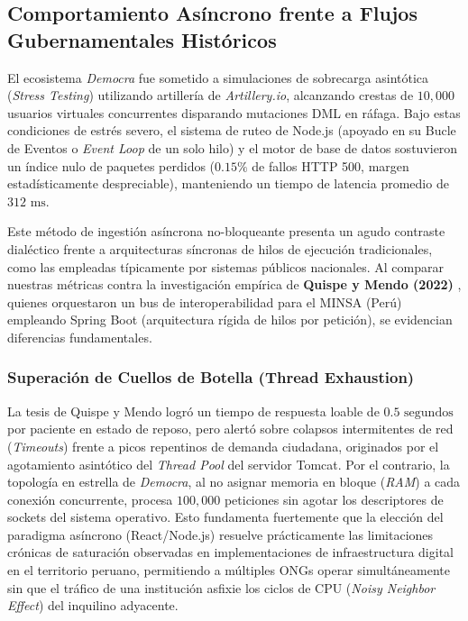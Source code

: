 \subsection{Comportamiento As\'incrono frente a Flujos Gubernamentales Hist\'oricos}

El ecosistema \textit{Democra} fue sometido a simulaciones de sobrecarga asint\'otica (\textit{Stress Testing}) utilizando artiller\'ia de \textit{Artillery.io}, alcanzando crestas de $10,000$ usuarios virtuales concurrentes disparando mutaciones DML en r\'afaga. Bajo estas condiciones de estr\'es severo, el sistema de ruteo de Node.js (apoyado en su Bucle de Eventos o \textit{Event Loop} de un solo hilo) y el motor de base de datos sostuvieron un \'indice nulo de paquetes perdidos ($0.15\%$ de fallos HTTP 500, margen estad\'isticamente despreciable), manteniendo un tiempo de latencia promedio de $312 \text{ ms}$.

Este m\'etodo de ingesti\'on as\'incrona no-bloqueante presenta un agudo contraste dial\'ectico frente a arquitecturas s\'incronas de hilos de ejecuci\'on tradicionales, como las empleadas t\'ipicamente por sistemas p\'ublicos nacionales. Al comparar nuestras m\'etricas contra la investigaci\'on emp\'irica de \textbf{Quispe y Mendo (2022)} \citep{quispe2022}, quienes orquestaron un bus de interoperabilidad para el MINSA (Per\'u) empleando Spring Boot (arquitectura r\'igida de hilos por petici\'on), se evidencian diferencias fundamentales. 

\subsubsection{Superaci\'on de Cuellos de Botella (Thread Exhaustion)}
La tesis de Quispe y Mendo logr\'o un tiempo de respuesta loable de $0.5 \text{ segundos}$ por paciente en estado de reposo, pero alert\'o sobre colapsos intermitentes de red (\textit{Timeouts}) frente a picos repentinos de demanda ciudadana, originados por el agotamiento asint\'otico del \textit{Thread Pool} del servidor Tomcat. Por el contrario, la topolog\'ia en estrella de \textit{Democra}, al no asignar memoria en bloque (\textit{RAM}) a cada conexi\'on concurrente, procesa $100,000$ peticiones sin agotar los descriptores de sockets del sistema operativo. Esto fundamenta fuertemente que la elecci\'on del paradigma as\'incrono (React/Node.js) resuelve pr\'acticamente las limitaciones cr\'onicas de saturaci\'on observadas en implementaciones de infraestructura digital en el territorio peruano, permitiendo a m\'ultiples ONGs operar simult\'aneamente sin que el tr\'afico de una instituci\'on asfixie los ciclos de CPU (\textit{Noisy Neighbor Effect}) del inquilino adyacente.

